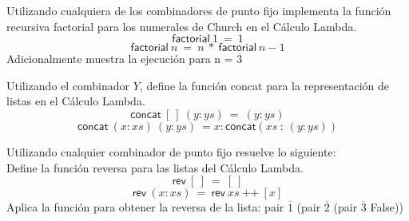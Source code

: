                 \begin{exercise}
                    Utilizando cualquiera de los combinadores de punto fijo implementa la función recursiva \textsf{factorial} para los numerales de Church en el Cálculo Lambda.
                    \[ \textsf{factorial}\ 1\ =\ 1 \]
                    \[ \textsf{factorial}\ n\ =\ n\ *\ \textsf{factorial}\ n-1\]
                    Adicionalmente muestra la ejecución para n = $\overline{3}$
                \end{exercise}






                \begin{exercise}
                    Utilizando el combinador $Y$, define la función \textsf{concat} para la representación de listas en el Cálculo Lambda.
                    \[
                        \textsf{concat}\ [\ ]\ (y:ys)\ =\ (y:ys)
                    \]
                    \[
                        \textsf{concat}\ (x:xs)\ (y:ys)\ = x:\textsf{concat}(xs\ :\ (y:ys))
                    \]
                \end{exercise}



                \begin{exercise}
                    Utilizando cualquier combinador de punto fijo resuelve lo siguiente:\\
                    
                    Define la función reversa para las listas del Cálculo Lambda. \\
                    \[
                        \textsf{rev}\ [\ ]\ =\ [\ ]
                    \]
                    \[
                        \textsf{rev}\ (x:xs)\ =\ \textsf{rev}\ xs\ \text{++}\ [x]
                    \]
                    Aplica la función para obtener la reversa de la lista: \textsf{pair $\overline{1}$ (pair $\overline{2}$ (pair $\overline{3}$ False))}
                \end{exercise}



